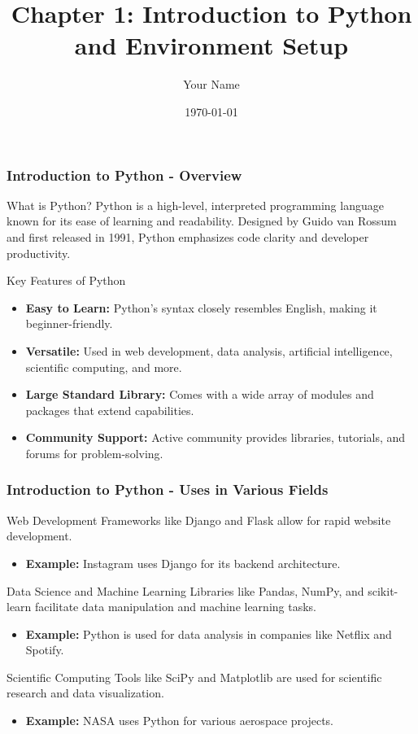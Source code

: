 \documentclass{beamer}
\title{Chapter 1: Introduction to Python and Environment Setup}
\author{Your Name}
\institute{Your Institution}
\date{\today}
\begin{document}
\frame{\titlepage}

\begin{frame}[fragile]
    \frametitle{Introduction to Python - Overview}
    \begin{block}{What is Python?}
        Python is a high-level, interpreted programming language known for its ease of learning and readability.
        Designed by Guido van Rossum and first released in 1991, Python emphasizes code clarity and developer productivity.
    \end{block}

    \begin{block}{Key Features of Python}
        \begin{itemize}
            \item \textbf{Easy to Learn:} Python’s syntax closely resembles English, making it beginner-friendly.
            \item \textbf{Versatile:} Used in web development, data analysis, artificial intelligence, scientific computing, and more.
            \item \textbf{Large Standard Library:} Comes with a wide array of modules and packages that extend capabilities.
            \item \textbf{Community Support:} Active community provides libraries, tutorials, and forums for problem-solving.
        \end{itemize}
    \end{block}
\end{frame}

\begin{frame}[fragile]
    \frametitle{Introduction to Python - Uses in Various Fields}
    \begin{block}{Web Development}
        Frameworks like Django and Flask allow for rapid website development.
        \begin{itemize}
            \item \textbf{Example:} Instagram uses Django for its backend architecture.
        \end{itemize}
    \end{block}

    \begin{block}{Data Science and Machine Learning}
        Libraries like Pandas, NumPy, and scikit-learn facilitate data manipulation and machine learning tasks.
        \begin{itemize}
            \item \textbf{Example:} Python is used for data analysis in companies like Netflix and Spotify.
        \end{itemize}
    \end{block}

    \begin{block}{Scientific Computing}
        Tools like SciPy and Matplotlib are used for scientific research and data visualization.
        \begin{itemize}
            \item \textbf{Example:} NASA uses Python for various aerospace projects.
        \end{itemize}
    \end{block}
\end{frame}
\end{document}
